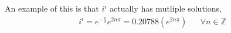 \documentclass[a4paper, 12pt]{article}
\begin{document}
An example of this is that $i^i$ actually has mutliple solutions, 
\begin{align}
    i^i = e^{-\frac{\pi}{2}} e^{2n\pi} = 0.20788 (e^{2n\pi})
    & & \forall n \in \mathbb{Z}
\end{align}
\end{document}
